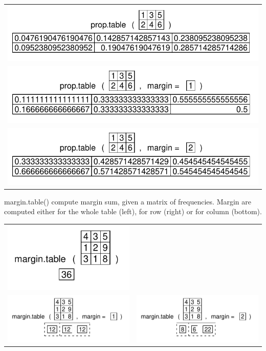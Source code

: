 \documentclass[pdflatex]{article}
\begin{document}
\begin{tabular}{c}
\includegraphics{prop_table1}\\
\includegraphics{prop_table_row}\\
\includegraphics{prop_table_column}
\end{tabular}

margin.table() compute margin sum, given a matrix of frequencies. Margin are
computed either for the whole table (left), for row (right) or for column
(bottom).

\begin{tabular}{cc}
\includegraphics{margin_table1} & \\
\includegraphics{margin_table_row} &  \includegraphics{margin_table_column}
\end{tabular}
\end{document}
